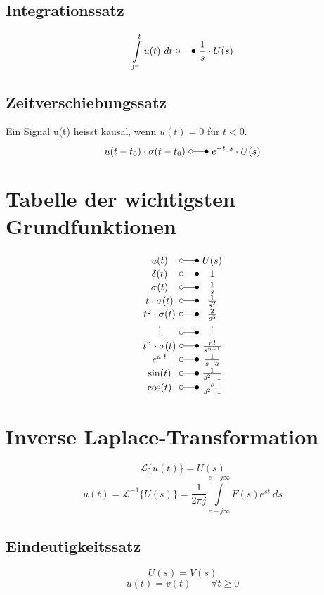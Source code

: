\subsection{Integrationssatz}
\[ 
    \int\limits_{0^-}^{t} u(t) ~ dt ~ \laplace ~ \frac{1}{s} \cdot U(s) 
\]

\subsection{Zeitverschiebungssatz}
Ein Signal u(t) heisst kausal, wenn $u(t) = 0$ für $t < 0$.
\[ 
    u(t - t_0) \cdot \sigma(t - t_0) ~ \laplace ~ e^{-t_0s} \cdot U(s) 
\]

\section{Tabelle der wichtigsten Grundfunktionen}
\[ 
    \begin{array}{c@{ ~ \laplace ~ }c}
        u(t) 
            & U(s) \\
        \delta(t) 
            & 1 \\
        \sigma(t) 
            & \frac{1}{s} \\
        t \cdot \sigma(t) 
            & \frac{1}{s^2} \\
        t^2 \cdot \sigma(t) 
            & \frac{2}{s^3} \\
        \vdots 
            & \vdots \\
        t^n \cdot \sigma(t) 
            & \frac{n!}{s^{n+1}} \\
        e^{a \cdot t} 
            & \frac{1}{s - a} \\
        \sin(t) 
            & \frac{1}{s^2 + 1} \\
        \cos(t) 
            & \frac{s}{s^2 + 1} \\
    \end{array} 
\]

\section{Inverse Laplace-Transformation}
\[ 
    \mathcal{L} \lbrace u(t) \rbrace = U(s)
\]
\[ 
    u(t) = \mathcal{L}^{-1} \lbrace U(s) \rbrace
    = \frac{1}{2\pi j} \int\limits_{e-j\infty}^{e+j\infty} F(s) e^{st} ~ ds
\]

\subsection{Eindeutigkeitssatz}
\[ 
    U(s) = V(s) 
\]
\[ 
    u(t) = v(t) \qquad \forall t \geq 0 
\]

